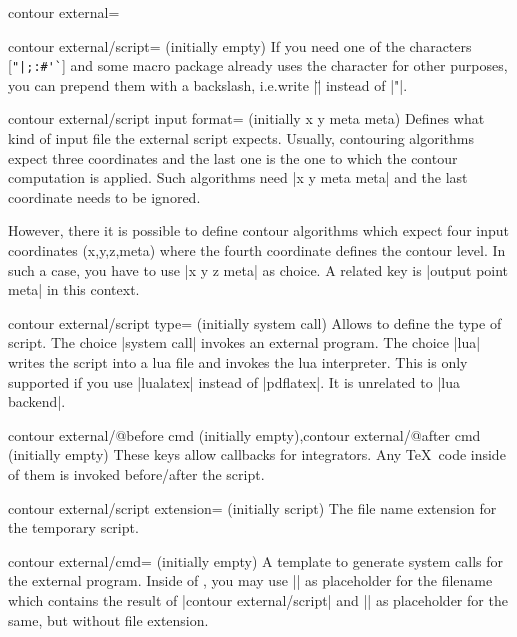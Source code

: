 {{\begin{plottype}[/pgfplots]{
    contour external=\textcolor{black}{}%
}
\begin{pgfplotskey}{contour external/script= (initially empty)}
        If you need one of the characters [\verb!"|;:#'`!] and some macro
        package already uses the character for other purposes, you can prepend
        them with a backslash, i.e.\@ write |\"| instead of |"|.
    \end{pgfplotskey}

	\begin{pgfplotskey}{contour external/script input format= (initially x y meta meta)}
		Defines what kind of input file the external script expects. Usually, contouring algorithms expect three coordinates and the last one is the one to which the contour computation is applied. Such algorithms need |x y meta meta| and the last coordinate needs to be ignored.

		However, there it is possible to define contour algorithms which expect four input coordinates (x,y,z,meta) where the fourth coordinate defines the contour level. In such a case, you have to use |x y z meta| as choice. A related key is |output point meta| in this context.
	\end{pgfplotskey}

	\begin{pgfplotskey}{contour external/script type= (initially system call)}
		Allows to define the type of script. The choice |system call| invokes an external program. The choice |lua| writes the script into a lua file and invokes the lua interpreter. This is only supported if you use |lualatex| instead of |pdflatex|. It is unrelated to |lua backend|.
	\end{pgfplotskey}
	\begin{pgfplotskeylist}{contour external/@before cmd (initially empty),contour external/@after cmd (initially empty)}
		These keys allow callbacks for integrators. Any \TeX\ code inside of them is invoked before/after the script.
	\end{pgfplotskeylist}

    \begin{pgfplotskey}{contour external/script extension= (initially script)}
        The file name extension for the temporary script.
    \end{pgfplotskey}

    \begin{pgfplotskey}{contour external/cmd= (initially empty)}
        A template to generate system calls for the external program. Inside of
        , you may use |\script| as placeholder for the
        filename which contains the result of |contour external/script| and |\scriptbase| as placeholder for the same, but without file extension.
    \end{pgfplotskey}


\end{plottype}}}
